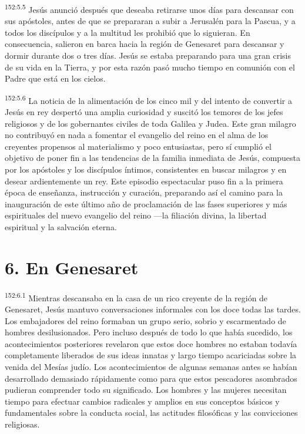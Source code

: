 \par
\textsuperscript{152:5.5} Jesús anunció después que deseaba retirarse unos días para descansar con sus apóstoles, antes de que se prepararan a subir a Jerusalén para la Pascua, y a todos los discípulos y a la multitud les prohibió que lo siguieran. En consecuencia, salieron en barca hacia la región de Genesaret para descansar y dormir durante dos o tres días. Jesús se estaba preparando para una gran crisis de su vida en la Tierra, y por esta razón pasó mucho tiempo en comunión con el Padre que está en los cielos.

\par
\textsuperscript{152:5.6} La noticia de la alimentación de los cinco mil y del intento de convertir a Jesús en rey despertó una amplia curiosidad y suscitó los temores de los jefes religiosos y de los gobernantes civiles de toda Galilea y Judea. Este gran milagro no contribuyó en nada a fomentar el evangelio del reino en el alma de los creyentes propensos al materialismo y poco entusiastas, pero sí cumplió el objetivo de poner fin a las tendencias de la familia inmediata de Jesús, compuesta por los apóstoles y los discípulos íntimos, consistentes en buscar milagros y en desear ardientemente un rey. Este episodio espectacular puso fin a la primera época de enseñanza, instrucción y curación, preparando así el camino para la inauguración de este último año de proclamación de las fases superiores y más espirituales del nuevo evangelio del reino ---la filiación divina, la libertad espiritual y la salvación eterna.

\section*{6. En Genesaret}
\par
\textsuperscript{152:6.1} Mientras descansaba en la casa de un rico creyente de la región de Genesaret, Jesús mantuvo conversaciones informales con los doce todas las tardes. Los embajadores del reino formaban un grupo serio, sobrio y escarmentado de hombres desilusionados. Pero incluso después de todo lo que había sucedido, los acontecimientos posteriores revelaron que estos doce hombres no estaban todavía completamente liberados de sus ideas innatas y largo tiempo acariciadas sobre la venida del Mesías judío. Los acontecimientos de algunas semanas antes se habían desarrollado demasiado rápidamente como para que estos pescadores asombrados pudieran comprender todo su significado. Los hombres y las mujeres necesitan tiempo para efectuar cambios radicales y amplios en sus conceptos básicos y fundamentales sobre la conducta social, las actitudes filosóficas y las convicciones religiosas.

